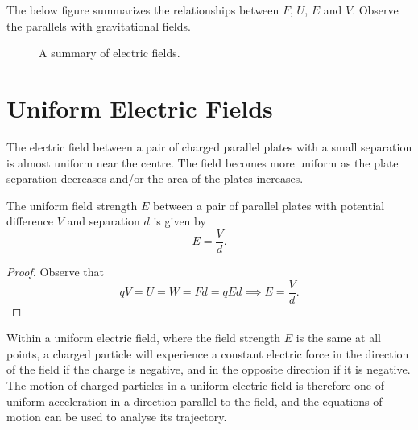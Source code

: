 The below figure summarizes the relationships between $F$, $U$, $E$ and $V$. Observe the parallels with gravitational fields.

\begin{figure}[H]
    \centering
    \caption{A summary of electric fields.}
\end{figure}

\section{Uniform Electric Fields}

The electric field between a pair of charged parallel plates with a small separation is almost uniform near the centre. The field becomes more uniform as the plate separation decreases and/or the area of the plates increases.

\begin{proposition}
    The uniform field strength $E$ between a pair of parallel plates with potential difference $V$ and separation $d$ is given by \[E = \frac{V}{d}.\]
\end{proposition}
\begin{proof}
    Observe that \[qV = U = W = Fd = qEd \implies E = \frac{V}{d}.\]
\end{proof}

Within a uniform electric field, where the field strength $E$ is the same at all points, a charged particle will experience a constant electric force in the direction of the field if the charge is negative, and in the opposite direction if it is negative. The motion of charged particles in a uniform electric field is therefore one of uniform acceleration in a direction parallel to the field, and the equations of motion can be used to analyse its trajectory.